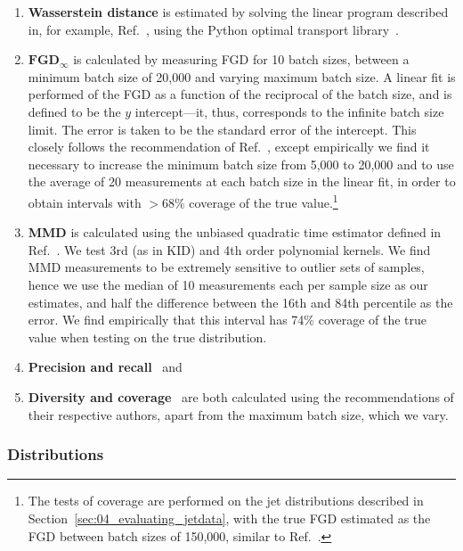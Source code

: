 \begin{enumerate}
    \item \textbf{Wasserstein distance} is estimated by solving the linear program described in, for example, Ref.~\cite{bertsimas_linearopt}, using the Python optimal transport library~\cite{flamary_pot}.
    \item $\mathbf{FGD}_{\infty}$ is calculated by measuring FGD for 10 batch sizes, between a minimum batch size of 20,000 and varying maximum batch size.
    A linear fit is performed of the FGD as a function of the reciprocal of the batch size, and \fgdinf is defined to be the $y$ intercept---it, thus, corresponds to the infinite batch size limit.
    The error is taken to be the standard error of the intercept.
    This closely follows the recommendation of Ref.~\cite{chong_unbiasedfid}, except empirically we find it necessary to increase the minimum batch size from 5,000 to 20,000 and to use the average of 20 measurements at each batch size in the linear fit, in order to obtain \fgdinf intervals with $>$68\% coverage of the true value.\footnote{The tests of coverage are performed on the jet distributions described in Section~\ref{sec:04_evaluating_jetdata}, with the true FGD estimated as the FGD between batch sizes of 150,000, similar to Ref.~\cite{chong_unbiasedfid}.}
    \item \textbf{MMD} is calculated using the unbiased quadratic time estimator defined in Ref.~\cite{gretton_mmd}.
    We test 3rd (as in KID) and 4th order polynomial kernels.
    We find MMD measurements to be extremely sensitive to outlier sets of samples, hence we use the median of 10 measurements each per sample size as our estimates, and half the difference between the 16th and 84th percentile as the error.
    We find empirically that this interval has 74\% coverage of the true value when testing on the true distribution.
    \item \textbf{Precision and recall}~\cite{kynkaanniemi_pr} and
    \item \textbf{Diversity and coverage}~\cite{naeem_dc} are both calculated using the recommendations of their respective authors, apart from the maximum batch size, which we vary.
\end{enumerate}

\subsubsection{Distributions}
\label{sec:04_evaluating_toydata_distributions}

